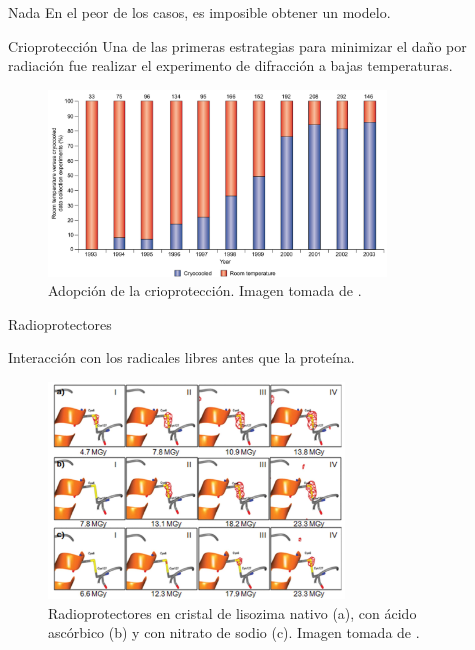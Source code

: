 \documentclass{beamer}
\begin{document}
\begin{frame}
	\begin{alertblock}{Nada}
		En el peor de los casos, es imposible obtener un modelo.
	\end{alertblock}
\end{frame}


\begin{frame}{Crioprotección}
Una de las primeras estrategias para minimizar el daño por radiación fue realizar el experimento de difracción a bajas temperaturas.

\begin{figure}[h]
	\centering
	\includegraphics[width=0.8\textwidth]{garman2003.png}
	\caption{Adopción de la crioprotección. Imagen tomada de \cite{Garman2003}.}
	\label{fig:mesh1}
\end{figure}

\end{frame}

\begin{frame}{Radioprotectores}

Interacción con los radicales libres antes que la proteína.

\begin{figure}[h]
	\centering
	\includegraphics[width=0.7\textwidth]{delamora2011.png}
	\caption{Radioprotectores en cristal de lisozima nativo (a), con ácido ascórbico (b) y con nitrato de sodio (c). Imagen tomada de \cite{DeLaMora2011}.}
	\label{fig:mesh1}
\end{figure}

\end{frame}
\end{document}

